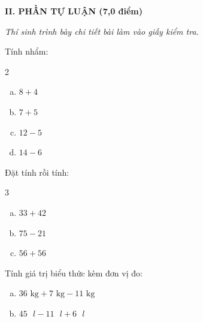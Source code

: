 \vspace{4mm}
\textbf{\large II. PHẦN TỰ LUẬN (7,0 điểm)}

{\itshape Thí sinh trình bày chi tiết bài làm vào giấy kiểm tra.}

\begin{bt}[1,0 điểm]
Tính nhẩm:
\begin{multicols}{2}
\begin{enumerate}[a)]
  \item $8 + 4$
  \item $7 + 5$
  \item $12 - 5$
  \item $14 - 6$
\end{enumerate}
\end{multicols}
\end{bt}

\begin{bt}[1,5 điểm]
Đặt tính rồi tính:
\begin{multicols}{3}
\begin{enumerate}[a)]
  \item $33 + 42$
  \item $75 - 21$
  \item $56 + 56$
\end{enumerate}
\end{multicols}
\end{bt}

\begin{bt}[1,0 điểm]
Tính giá trị biểu thức kèm đơn vị đo:
\begin{enumerate}[a)]
  \item $36\text{ kg} + 7\text{ kg} - 11\text{ kg}$
  \item $45\text{ }l - 11\text{ }l + 6\text{ }l$
\end{enumerate}
\end{bt}

